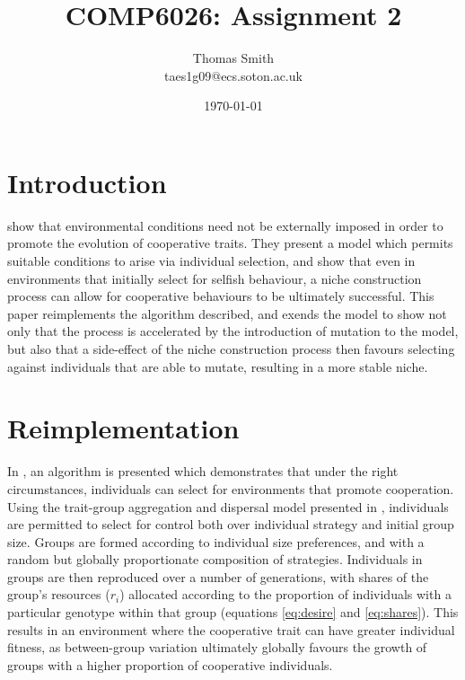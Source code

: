 \documentclass[11pt]{article}
\begin{document}
\title      {\textbf{COMP6026: Assignment 2}}
\author	    {Thomas Smith\\taes1g09@ecs.soton.ac.uk}
\date       {\today}
\maketitle
\section{Introduction}

\citet*{orig} show that environmental conditions need not be externally imposed in order to promote the evolution of cooperative traits. They present a model which permits suitable conditions to arise via individual selection, and show that even in environments that initially select for selfish behaviour, a niche construction process can allow for cooperative behaviours to be ultimately successful. This paper reimplements the algorithm described, and exends the model to show not only that the process is accelerated by the introduction of mutation to the model, but also that a side-effect of the niche construction process then favours selecting against individuals that are able to mutate, resulting in a more stable niche.




\section{Reimplementation}
In \citet{orig}, an algorithm is presented which demonstrates that under the right circumstances, individuals can select for environments that promote cooperation. Using the trait-group aggregation and dispersal model presented in \citet{wilson}, individuals are permitted to select for control both over individual strategy and initial group size. Groups are formed according to individual size preferences, and with a random but globally proportionate composition of strategies. Individuals in groups are then reproduced over a number of generations, with shares of the group's resources ($r_i$) allocated according to the proportion of individuals with a particular genotype within that group (equations \ref{eq:desire} and \ref{eq:shares}). This results in an environment where the cooperative trait can have greater individual fitness, as between-group variation ultimately globally favours the growth of groups with a higher proportion of cooperative individuals.
\end{document}
